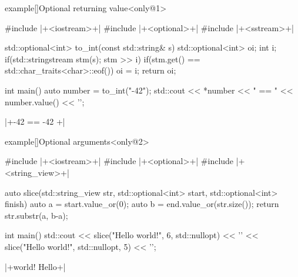 \begin{frame}[fragile]{}
    \begin{varblock}{example}[\textwidth]{Optional returning value}<only@1>
        \begin{Cpp}
            #include |+<iostream>+|
            #include |+<optional>+|
            #include |+<sstream>+|

            std::optional<int> to_int(const std::string& s) {
                std::optional<int> oi{};
                int i;
                if(std::stringstream stm(s); stm >> i)
                    if(stm.get() == std::char_traits<char>::eof())
                        oi = i;
                return oi;
            }

            int main()
            {
                auto number = to_int("-42");
                std::cout << *number << " == " << number.value() << '\n';
            }
        \end{Cpp}
        \begin{Bash}[numbers=none]
            |+-42 == -42 +|
        \end{Bash}
    \end{varblock}
    \begin{varblock}{example}[\textwidth]{Optional arguments}<only@2>
        \begin{Cpp}
            #include |+<iostream>+|
            #include |+<optional>+|
            #include |+<string_view>+|

            auto slice(std::string_view str,
                       std::optional<int> start,
                       std::optional<int> finish)
            {
                auto a = start.value_or(0);
                auto b = end.value_or(str.size());
                return str.substr(a, b-a);
            }

            int main()
            {
                std::cout
                    << slice("Hello world!", 6, std::nullopt) << '\n'
                    << slice("Hello world!", std::nullopt, 5) << '\n';
            }
        \end{Cpp}
        \begin{Bash}[numbers=none]
            |+world!
            Hello+|
        \end{Bash}
    \end{varblock}
\end{frame}

